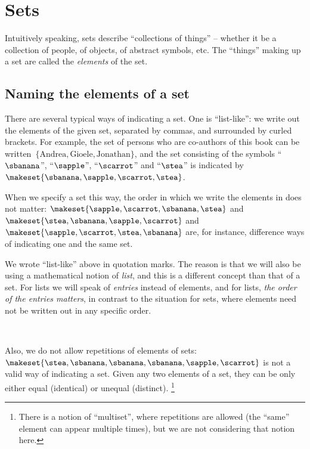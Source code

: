 
\section{Sets}

Intuitively speaking, sets describe ``collections of things'' -- whether it be a collection of people, of objects, of abstract symbols, etc.
The ``things'' making up a set are called the \emph{elements} of the set.

\subsection{Naming the elements of a set}

There are several typical ways of indicating a set.
One is ``list-like'': we write out the elements of the given set, separated by commas, and surrounded by curled brackets.
For example, the set of persons who are co-authors of this book can be written~$\{ \text{Andrea}, \text{Gioele}, \text{Jonathan} \}$, and the set consisting of the symbols ``$\sbanana$'', ``$\sapple$'', ``$\scarrot$'' and ``$\stea$'' is indicated by $\makeset{ \sbanana, \sapple, \scarrot, \stea}$.

When we specify a set this way, the order in which we write the elements in does not matter:
$\makeset{ \sapple, \scarrot, \sbanana, \stea}$ and~$\makeset{ \stea, \sbanana, \sapple, \scarrot}$ and~$\makeset{ \sapple, \scarrot, \stea, \sbanana}$ are, for instance, difference ways of indicating one and the same set.

We wrote ``list-like'' above in quotation marks. The reason is that we will also be using a mathematical notion of \emph{list}, and this is a different concept than that of a set. For lists we will speak of \emph{entries} instead of elements, and for lists, \emph{the order of the entries matters}, in contrast to the situation for sets, where elements need not be written out in any specific order. 

\




Also, we do not allow repetitions of elements of sets:
$\makeset{ \stea, \sbanana, \sbanana, \sbanana, \sapple, \scarrot }$ is not a valid way of indicating a set.
Given any two elements of a set, they can be only either equal (identical) or unequal (distinct).
\footnote{There is a notion of ``multiset'', where repetitions are allowed (the ``same'' element can appear multiple times), but we are not considering that notion here.}

